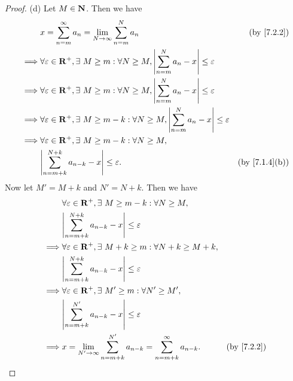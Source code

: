 \begin{proof}{(d)}
  Let \(M \in \mathbf{N}\).
  Then we have
  \begin{align*}
             & x = \sum_{n = m}^\infty a_n = \lim_{N \to \infty} \sum_{n = m}^N a_n                                                  & \text{(by \cref{7.2.2})}    \\
    \implies & \forall \varepsilon \in \R^+, \exists\ M \geq m : \forall N \geq M, \abs{\sum_{n = m}^N a_n - x} \leq \varepsilon                                   \\
    \implies & \forall \varepsilon \in \R^+, \exists\ M \geq m : \forall N \geq M, \abs{\sum_{n = m}^N a_n - x} \leq \varepsilon                                   \\
    \implies & \forall \varepsilon \in \R^+, \exists\ M \geq m - k : \forall N \geq M, \abs{\sum_{n = m}^N a_n - x} \leq \varepsilon                               \\
    \implies & \forall \varepsilon \in \R^+, \exists\ M \geq m - k : \forall N \geq M,                                                                             \\
             & \abs{\sum_{n = m + k}^{N + k} a_{n - k} - x} \leq \varepsilon.                                                        & \text{(by \cref{7.1.4}(b))}
  \end{align*}
  Now let \(M' = M + k\) and \(N' = N + k\).
  Then we have
  \begin{align*}
             & \forall \varepsilon \in \R^+, \exists\ M \geq m - k : \forall N \geq M,                                                  \\
             & \abs{\sum_{n = m + k}^{N + k} a_{n - k} - x} \leq \varepsilon                                                            \\
    \implies & \forall \varepsilon \in \R^+, \exists\ M + k \geq m : \forall N + k \geq M + k,                                          \\
             & \abs{\sum_{n = m + k}^{N + k} a_{n - k} - x} \leq \varepsilon                                                            \\
    \implies & \forall \varepsilon \in \R^+, \exists\ M' \geq m : \forall N' \geq M',                                                   \\
             & \abs{\sum_{n = m + k}^{N'} a_{n - k} - x} \leq \varepsilon                                                               \\
    \implies & x = \lim_{N' \to \infty} \sum_{n = m + k}^{N'} a_{n - k} = \sum_{n = m + k}^\infty a_{n - k}. & \text{(by \cref{7.2.2})}
  \end{align*}
\end{proof}

